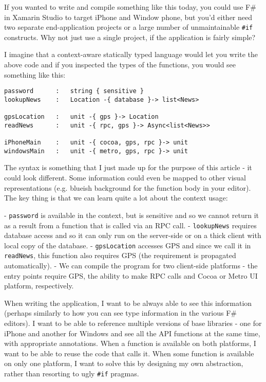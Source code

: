 If you wanted to write and compile something like this today, you could use F\# in Xamarin 
Studio to target iPhone and Window phone, but you'd either need two separate end-application projects 
or a large number of unmaintainable \texttt{\#if} constructs. Why not just use a single project, if 
the application is fairly simple?

I imagine that a context-aware statically typed language would let you write the above code and 
if you inspected the types of the functions, you would see something like this:

\begin{verbatim}
password      :   string { sensitive }
lookupNews    :   Location -{ database }-> list<News> 

gpsLocation   :   unit -{ gps }-> Location 
readNews      :   unit -{ rpc, gps }-> Async<list<News>> 

iPhoneMain    :   unit -{ cocoa, gps, rpc }-> unit 
windowsMain   :   unit -{ metro, gps, rpc }-> unit 
\end{verbatim}

The syntax is something that I just made up for the purpose of this article - it could
look different. Some information could even be mapped to other visual representations
(e.g. blueish background for the function body in your editor). The key thing is that
we can learn quite a lot about the context usage:

 - \texttt{password} is available in the context, but is sensitive and so we cannot return it
   as a result from a function that is called via an RPC call.
 - \texttt{lookupNews} requires database access and so it can only run on the server-side
   or on a thick client with local copy of the database.
 - \texttt{gpsLocation} accesses GPS and since we call it in \texttt{readNews}, this function
   also requires GPS (the requirement is propagated automatically).
 - We can compile the program for two client-side platforms - the entry points require
   GPS, the ability to make RPC calls and Cocoa or Metro UI platform, respectively.

When writing the application, I want to be always able to see this information (perhaps
similarly to how you can see type information in the various F\# editors). I want to be
able to reference multiple versions of base libraries - one for iPhone and another for
Windows and see all the API functions at the same time, with appropriate annotations.
When a function is available on both platforms, I want to be able to reuse the code that
calls it. When some function is available on only one platform, I want to solve this by
designing my own abstraction, rather than resorting to ugly \texttt{\#if} pragmas.

